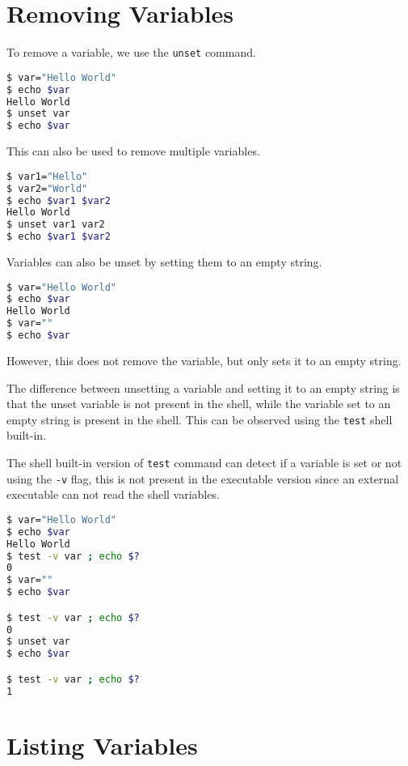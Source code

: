 \section{Removing Variables}

To remove a variable, we use the \lstinline{unset} command.

\begin{lstlisting}[language=bash]
$ var="Hello World"
$ echo $var
Hello World
$ unset var
$ echo $var

\end{lstlisting}

This can also be used to remove multiple variables.

\begin{lstlisting}[language=bash]
$ var1="Hello"
$ var2="World"
$ echo $var1 $var2
Hello World
$ unset var1 var2
$ echo $var1 $var2

\end{lstlisting}

Variables can also be unset by setting them to an empty string.

\begin{lstlisting}[language=bash]
$ var="Hello World"
$ echo $var
Hello World
$ var=""
$ echo $var

\end{lstlisting}

However, this does not remove the variable, but only sets it to an empty string.

The difference between unsetting a variable and setting it to an empty string is that the unset variable is not present in the shell, while the variable set to an empty string is present in the shell.
This can be observed using the \lstinline|test| shell built-in.

The shell built-in version of \lstinline{test} command can detect if a variable is set or not using the \lstinline{-v} flag, this is not present in the executable version since an external executable can not read the shell variables.

\begin{lstlisting}[language=bash]
$ var="Hello World"
$ echo $var
Hello World
$ test -v var ; echo $?
0
$ var=""
$ echo $var

$ test -v var ; echo $?
0
$ unset var
$ echo $var

$ test -v var ; echo $?
1
\end{lstlisting}


\section{Listing Variables}

